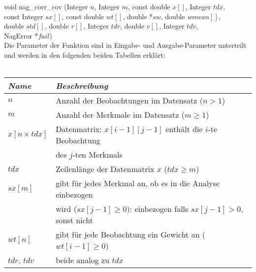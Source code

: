 \noindent void nag\_corr\_cov (Integer $n$, Integer $m$, const double $x[]$, Integer $tdx$,\\
\hspace*{5mm} const Integer $sx[]$, const double $wt[]$, double *$sw$, double $wmean[]$,\\
\hspace*{5mm} double $std[]$, double $r[]$, Integer $tdr$, double $v[]$, Integer $tdv$,\\
\hspace*{5mm} NagError *$fail$)\\

\noindent Die Parameter der Funktion sind in Eingabe- und Ausgabe-Parameter unterteilt und werden in den folgenden beiden Tabellen erklärt:\\

\\

\noindent \begin{tabular}[ht]{|l|l|}
  	\hline
  	\textit{Name} & \textit{Beschreibung}\\
  	\hline \hline
  	$n$ & Anzahl der Beobachtungen im Datensatz ($n > 1$)\\ \hline
  	$m$ & Anzahl der Merkmale im Datensatz ($m \geq 1$)\\ \hline
	$x[n \times tdx]$ & Datenmatrix: $x[i - 1][j - 1]$ enthält die $i$-te Beobachtung\\
	& des $j$-ten Merkmals\\ \hline
	$tdx$ & Zeilenlänge der Datenmatrix $x$ ($tdx \geq m$)\\ \hline
	$sx[m]$ & gibt für jedes Merkmal an, ob es in die Analyse einbezogen\\
	& wird ($sx[j-1] \geq 0$): einbezogen falls $sx[j-1] > 0$, sonst nicht\\ \hline
	$wt[n]$ & gibt für jede Beobachtung ein Gewicht an ($wt[i-1] \geq 0$)\\ \hline
	$tdr$, $tdv$ & beide analog zu $tdx$\\
	\hline
\end{tabular}\\\\

\newpage

\\
	
